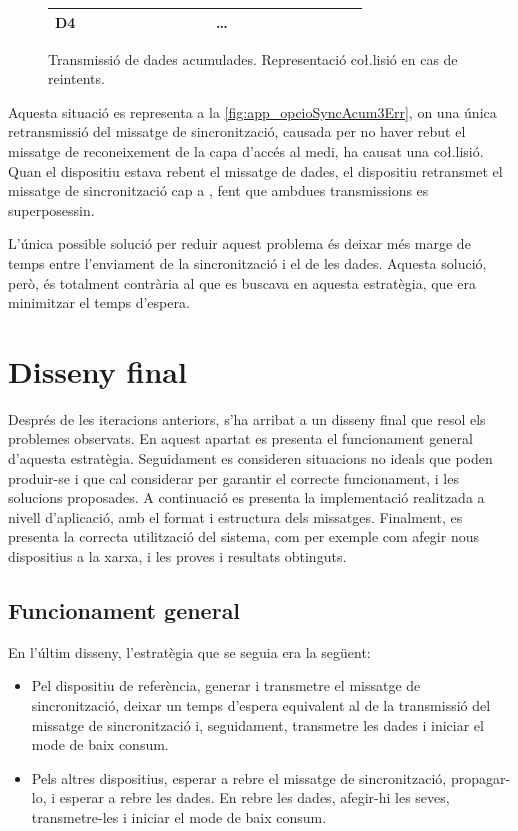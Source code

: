 \documentclass{tfgitic}[2024/07/01]
\begin{document}
{\begin{figure}[ht]
{\begin{tabular}{!{\vrule width \heavyrulewidth}c!{\vrule width \heavyrulewidth}ccccccccccc!{\vrule width \heavyrulewidth}}
{D4} & ~~~~~~~~~~~~~~ & & ~~~~~~~~~~~~~~\\

\toprule
\end{tabular}
}
    \caption{Transmissió de dades acumulades. Representació co\l.lisió en cas de reintents.}
    \label{fig:app_opcioSyncAcum3Err}
\end{figure}

Aquesta situació es representa a la \autoref{fig:app_opcioSyncAcum3Err}, on una única retransmissió del missatge de sincronització, causada per no haver rebut el missatge de reconeixement de la capa d'accés al medi, ha causat una co\l.lisió. Quan el dispositiu  estava rebent el missatge de dades, el dispositiu  retransmet el missatge de sincronització cap a , fent que ambdues transmissions es superposessin.

L'única possible solució per reduir aquest problema és deixar més marge de temps entre l'enviament de la sincronització i el de les dades. Aquesta solució, però, és totalment contrària al que es buscava en aquesta estratègia, que era minimitzar el temps d'espera.

\section{Disseny final}
Després de les iteracions anteriors, s'ha arribat a un disseny final que resol els problemes observats. En aquest apartat es presenta el funcionament general d'aquesta estratègia. Seguidament es consideren situacions no ideals que poden produir-se i que cal considerar per garantir el correcte funcionament, i les solucions proposades. A continuació es presenta la implementació realitzada a nivell d'aplicació, amb el format i estructura dels missatges. Finalment, es presenta la correcta utilització del sistema, com per exemple com afegir nous dispositius a la xarxa, i les proves i resultats obtinguts.

\subsection{Funcionament general}
En l'últim disseny, l'estratègia que se seguia era la següent:
\begin{itemize}
    \item Pel dispositiu de referència, generar i transmetre el missatge de sincronització, deixar un temps d'espera equivalent al de la transmissió del missatge de sincronització i, seguidament, transmetre les dades i iniciar el mode de baix consum.
    \item Pels altres dispositius, esperar a rebre el missatge de sincronització, propagar-lo, i esperar a rebre les dades. En rebre les dades, afegir-hi les seves, transmetre-les i iniciar el mode de baix consum.
\end{itemize}

}
\end{document}
